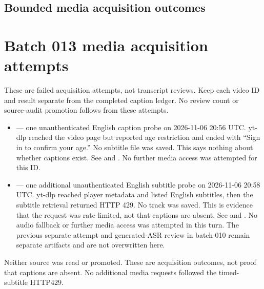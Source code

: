 \subsection{Bounded media acquisition outcomes}\label{appendix-877738f6f4d2-bounded-media-acquisition-outcomes}

\hypertarget{appendix-877738f6f4d2-bounded-media-acquisition-outcomes}{}

\section{Batch 013 media acquisition attempts}\label{appendix-877738f6f4d2-batch-013-media-acquisition-attempts}

\hypertarget{appendix-877738f6f4d2-batch-013-media-acquisition-attempts}{}

These are failed acquisition attempts, not transcript reviews. Keep each video ID and result separate from the completed caption ledger. No review count or source-audit promotion follows from these attempts.

\begin{itemize}
\tightlist
\item
   --- one unauthenticated English caption probe on 2026-11-06 20:56 UTC. yt-dlp reached the video page but reported age restriction and ended with ``Sign in to confirm your age.'' No subtitle file was saved. This says nothing about whether captions exist. See  and . No further media access was attempted for this ID.
\item
   --- one additional unauthenticated English subtitle probe on 2026-11-06 20:58 UTC. yt-dlp reached player metadata and listed English subtitles, then the subtitle retrieval returned HTTP 429. No track was saved. This is evidence that the request was rate-limited, not that captions are absent. See  and . No audio fallback or further media access was attempted in this turn. The previous separate attempt and generated-ASR review in batch-010 remain separate artifacts and are not overwritten here.
\end{itemize}

Neither source was read or promoted. These are acquisition outcomes, not proof that captions are absent. No additional media requests followed the timed-subtitle HTTP429.

